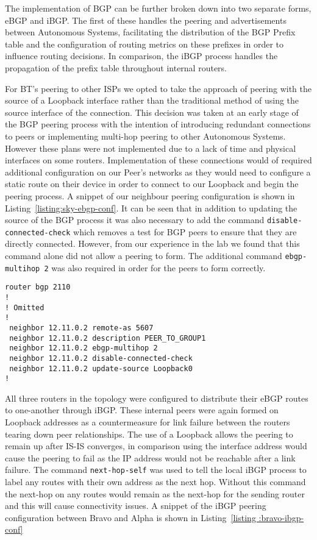 The implementation of BGP can be further broken down into two separate forms,
eBGP and iBGP. The first of these handles the peering and advertisements
between Autonomous Systems, facilitating the distribution of the BGP Prefix
table and the configuration of routing metrics on these prefixes in order to
influence routing decisions. In comparison, the iBGP process handles the
propagation of the prefix table throughout internal routers.

For BT's peering to other ISPs we opted to take the approach of peering with
the source of a Loopback interface rather than the traditional method of using
the source interface of the connection. This decision was taken at an early
stage of the BGP peering process with the intention of introducing redundant
connections to peers or implementing multi-hop peering to other Autonomous
Systems. However these plans were not implemented due to a lack of time and
physical interfaces on some routers. Implementation of these connections would
of required additional configuration on our Peer's networks as they would need
to configure a static route on their device in order to connect to our Loopback
and begin the peering process. A snippet of our neighbour peering configuration
is shown in Listing~\ref{listing:sky-ebgp-conf}. It can be seen that in
addition to updating the source of the BGP process it was also necessary to add
the command \texttt{disable-connected-check} which removes a test for BGP peers
to ensure that they are directly connected. However, from our experience in the
lab we found that this command alone did not allow a peering to form. The
additional command \texttt{ebgp-multihop 2} was also required in order for the
peers to form correctly.

\begin{lstlisting}[caption={BT-Sky eBGP Configuration}, label={listing:sky-ebgp-conf}]
router bgp 2110
!
! Omitted
!
 neighbor 12.11.0.2 remote-as 5607
 neighbor 12.11.0.2 description PEER_TO_GROUP1
 neighbor 12.11.0.2 ebgp-multihop 2
 neighbor 12.11.0.2 disable-connected-check
 neighbor 12.11.0.2 update-source Loopback0
!
\end{lstlisting}

All three routers in the topology were configured to distribute their eBGP
routes to one-another through iBGP. These internal peers were again formed on
Loopback addresses as a countermeasure for link failure between the routers
tearing down peer relationships. The use of a Loopback allows the peering to
remain up after IS-IS converges, in comparison using the interface address
would cause the peering to fail as the IP address would not be reachable after
a link failure. The command \texttt{next-hop-self} was used to tell the local iBGP
process to label any routes with their own address as the next hop. Without
this command the next-hop on any routes would remain as the next-hop for the
sending router and this will cause connectivity issues. A snippet of the iBGP
peering configuration between Bravo and Alpha is shown in Listing~\ref{listing
:bravo-ibgp-conf}

